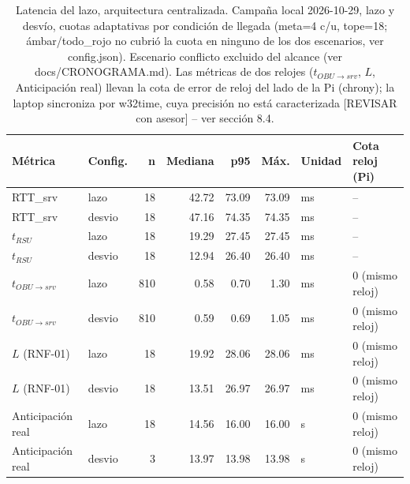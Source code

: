 \begin{table}[H]
\centering
\caption{Latencia del lazo, arquitectura centralizada. Campaña local 2026-10-29, lazo y desvío, cuotas adaptativas por condición de llegada (meta=4 c/u, tope=18; ámbar/todo_rojo no cubrió la cuota en ninguno de los dos escenarios, ver config.json). Escenario conflicto excluido del alcance (ver docs/CRONOGRAMA.md). Las métricas de dos relojes ($t_{OBU\to srv}$, $L$, Anticipación real) llevan la cota de error de reloj del lado de la Pi (chrony); la laptop sincroniza por w32time, cuya precisión no está caracterizada [REVISAR con asesor] -- ver sección 8.4.}
\label{tab:latencia_campana_centralizada}
\small
\begin{tabular}{llrrrrll}
\toprule
\textbf{Métrica} & \textbf{Config.} & \textbf{n} & \textbf{Mediana} & \textbf{p95} & \textbf{Máx.} & \textbf{Unidad} & \textbf{Cota reloj (Pi)} \\
\midrule
RTT\_srv & lazo & 18 & 42.72 & 73.09 & 73.09 & ms & -- \\
RTT\_srv & desvio & 18 & 47.16 & 74.35 & 74.35 & ms & -- \\
$t_{RSU}$ & lazo & 18 & 19.29 & 27.45 & 27.45 & ms & -- \\
$t_{RSU}$ & desvio & 18 & 12.94 & 26.40 & 26.40 & ms & -- \\
$t_{OBU\to srv}$ & lazo & 810 & 0.58 & 0.70 & 1.30 & ms & 0 (mismo reloj) \\
$t_{OBU\to srv}$ & desvio & 810 & 0.59 & 0.69 & 1.05 & ms & 0 (mismo reloj) \\
$L$ (RNF-01) & lazo & 18 & 19.92 & 28.06 & 28.06 & ms & 0 (mismo reloj) \\
$L$ (RNF-01) & desvio & 18 & 13.51 & 26.97 & 26.97 & ms & 0 (mismo reloj) \\
Anticipación real & lazo & 18 & 14.56 & 16.00 & 16.00 & s & 0 (mismo reloj) \\
Anticipación real & desvio & 3 & 13.97 & 13.98 & 13.98 & s & 0 (mismo reloj) \\
\bottomrule
\end{tabular}
\end{table}
